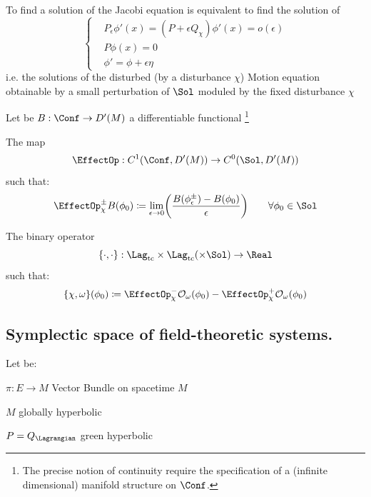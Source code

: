 \documentclass[a4paper,11pt]{scrartcl}
\begin{document}
	\begin{proposition}
		To find a solution of the Jacobi equation is equivalent to find the solution of 
   			\begin{displaymath}
   			   	\begin{cases} 
  					& P_\epsilon \phi'(x) = (P + \epsilon Q_\chi ) \phi'(x) = o(\epsilon)  \\ 
					& P \phi(x) = 0 \\
					& \phi' = \phi + \epsilon \eta
				\end{cases} 			
   			\end{displaymath}		
		i.e. the solutions of the disturbed (by a disturbance $\chi$) Motion equation obtainable by a small perturbation of $\Sol$ moduled by the fixed disturbance $\chi$
	\end{proposition}	
	Let be $B:\Conf \rightarrow D'(M)$ a differentiable functional \footnote{The precise notion of continuity require the specification of a (infinite dimensional) manifold structure on $\Conf$.}
	\begin{definition}
		The map
		$$\EffectOp : C^1(\Conf,D'(M)) \rightarrow C^0(\Sol,D'(M))$$
		such that:
		$$	\EffectOp_\chi^\pm B ( \phi_0) \coloneqq \lim_{\epsilon \rightarrow 0} \biggr( \frac{B(\phi_\epsilon^\pm) - B (\phi_0)}{\epsilon} \biggr)  \qquad \forall \phi_0 \in \Sol $$
	\end{definition}
	\begin{definition}
 		The binary operator
		$$ \{\cdot,\cdot\}:\Lag_{\textrm{tc}} \times \Lag_{\textrm{tc}} ( \times \Sol ) \rightarrow \Real 	$$
		such that:
		$$ \{\chi, \omega \}(\phi_0) \coloneqq \EffectOp_\chi^- \mathcal{O}_\omega (\phi_0) - \EffectOp_\chi^+ \mathcal{O}_\omega(\phi_0) $$
	\end{definition}
	
	
	\subsection*{Symplectic space of field-theoretic systems.}
	Let be:
	\begin{compactitemize}
		\item $\pi : E \rightarrow M $ Vector Bundle on spacetime $M$
		\item $M$  globally hyperbolic
		\item $P= Q_\Lagrangian$ green hyperbolic
	\end{compactitemize}
	
\end{document}
